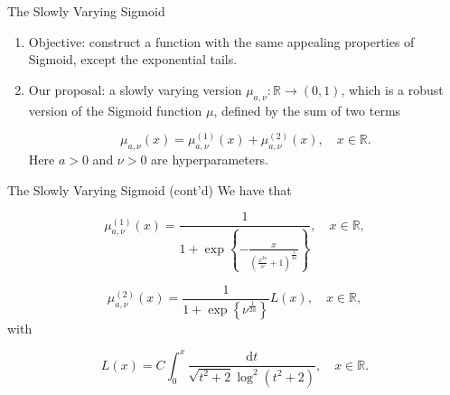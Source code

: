 \documentclass{beamer}
\newcommand{\bracket}[1]{\left ( #1 \right )}
\newcommand{\curly}[1]{\left \{ #1 \right \} }
\def\d{\mathrm{d}}
\begin{document}
\begin{frame}
    \tableofcontents[currentsection]
\end{frame}

\begin{frame}{The Slowly Varying Sigmoid}

    \begin{enumerate}
        \item Objective: construct a function with 
        the same appealing properties of Sigmoid, except the exponential tails.
        \item Our proposal: a slowly varying version $\mu_{a, \nu}: \mathbb{R} \to (0, 1)$, 
which is a robust version of the Sigmoid function $\mu$,
defined by the sum of two terms

\begin{equation*}
    \mu_{a, \nu}(x) = \mu_{a, \nu}^{(1)}(x) + \mu_{a, \nu}^{(2)}(x), \quad x \in \mathbb{R}.
\end{equation*}
Here $a > 0$ and $\nu > 0$ are hyperparameters.

    \end{enumerate}


\end{frame}

\begin{frame}{The Slowly Varying Sigmoid (cont'd)}
We have that

\begin{equation*}
  \mu_{a, \nu}^{(1)}(x) = \frac{1}{1+ \exp 
  \curly{ - \frac{x}{\bracket{\frac{x^{2a}}{ \nu} + 1}^{\frac{1}{2a}} }}}, \quad x \in \mathbb{R},
\end{equation*}

\begin{equation*}
  \mu_{a, \nu}^{(2)}(x) = \frac{1}{1+\exp \curly{\nu^{\frac{1}{2a}}}} L(x), \quad x \in \mathbb{R},
\end{equation*}
with

\begin{equation*}
  L(x) = C \int_0^x \frac{\d t}{\sqrt{t^2+2} \log^2( t^2+2)}, \quad x \in \mathbb{R}.
\end{equation*}

\end{frame}
\end{document}
